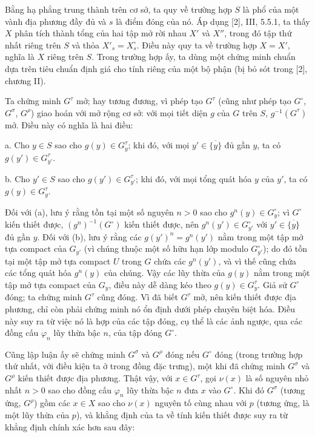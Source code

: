 Bằng hạ phẳng trung thành trên cơ sở, ta quy về trường hợp $S$ là phổ của một
vành địa phương đầy đủ và $s$ là điểm đóng của nó. Áp dụng [2], III, 5.5.1,
ta thấy $X$ phân tích thành tổng của hai tập mở rời nhau $X'$ và $X''$, trong
đó tập thứ nhất riêng trên $S$ và thỏa $X'_s=X_s^\circ$. Điều này quy ta về
trường hợp $X=X'$, nghĩa là $X$ riêng trên $S$. Trong trường hợp ấy, ta dùng
một chứng minh chuẩn dựa trên tiêu chuẩn định giá cho tính riêng của một bộ
phận (bị bỏ sót trong [2], chương II).

Ta chứng minh $G^\tau$ mở; hay tương đương, vì phép tạo $G^\tau$ (cũng như
phép tạo $G^\circ$, $G^\sigma$, $G^\rho$) giao hoán với mở rộng cơ sở: với
mọi tiết diện $g$ của $G$ trên $S$, $g^{-1}(G^\tau)$ mở. Điều này có nghĩa là
hai điều:

\medskip
\noindent a. Cho $y\in S$ sao cho $g(y)\in G_y^\tau$; khi đó, với mọi
$y'\in\overline{\{y\}}$ đủ gần $y$, ta có $g(y')\in G_{y'}^\tau$.

\medskip
\noindent b. Cho $y'\in S$ sao cho $g(y')\in G_{y'}^\tau$; khi đó, với mọi
tổng quát hóa $y$ của $y'$, ta có $g(y)\in G_y^\tau$.

Đối với (a), lưu ý rằng tồn tại một số nguyên $n>0$ sao cho
$g^n(y)\in G_y^\circ$; vì $G^\circ$ kiến thiết được,
$(g^n)^{-1}(G^\circ)$ kiến thiết được, nên
$g^n(y')\in G_{y'}^\circ$ với $y'\in\overline{\{y\}}$ đủ gần $y$. Đối với
(b), lưu ý rằng các $g(y')^n=g^n(y')$ nằm trong một tập mở tựa compact của
$G_{y'}$ (vì chúng thuộc một số hữu hạn lớp modulo $G_{y'}^\circ$); do đó tồn
tại một tập mở tựa compact $U$ trong $G$ chứa các $g^n(y')$, và vì thế cũng
chứa các tổng quát hóa $g^n(y)$ của chúng. Vậy các lũy thừa của $g(y)$ nằm
trong một tập mở tựa compact của $G_y$, điều này dễ dàng kéo theo
$g(y)\in G_y^\tau$.
Giả sử $G^\circ$ đóng; ta chứng minh $G^\tau$ cũng đóng. Vì đã biết
$G^\tau$ mở, nên kiến thiết được địa phương, chỉ còn phải chứng minh nó ổn
định dưới phép chuyên biệt hóa. Điều này suy ra từ việc nó là hợp của các tập
đóng, cụ thể là các ảnh ngược, qua các đồng cấu $\varphi_n$ lũy thừa bậc
$n$, của tập đóng $G^\circ$.

Cũng lập luận ấy sẽ chứng minh $G^\sigma$ và $G^\rho$ đóng nếu $G^\circ$
đóng (trong trường hợp thứ nhất, với điều kiện ta ở trong đồng đặc trưng), một
khi đã chứng minh $G^\sigma$ và $G^\rho$ kiến thiết được địa phương. Thật vậy,
với $x\in G^\tau$, gọi $\nu(x)$ là số nguyên nhỏ nhất $n>0$ sao cho đồng cấu
$\varphi_n$ lũy thừa bậc $n$ đưa $x$ vào $G^\circ$. Khi đó $G^\sigma$
(tương ứng, $G^\rho$) gồm các $x\in X$ sao cho $\nu(x)$ nguyên tố cùng nhau với $p$ (tương ứng,
là một lũy thừa của $p$), và khẳng định của ta về tính kiến thiết được suy ra
từ khẳng định chính xác hơn sau đây:

